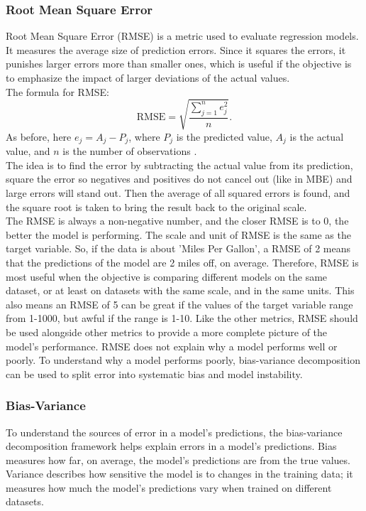 \newpage

\subsubsection{Root Mean Square Error}   

Root Mean Square Error (RMSE) is a metric used to evaluate regression models. It measures the average size of prediction errors. Since it squares the errors, it punishes larger errors more than smaller ones, which is useful if the objective is to emphasize the impact of larger deviations of the actual values.
\\
The formula for RMSE:
\begin{equation}
	\text{RMSE}=\sqrt{\frac{ \sum_{j=1}^{n} e_j^2 }{n}}.
\end{equation}
As before, here $e_{j}=A_{j}-P_{j}$, where $P_{j}$ is the predicted value, $A_{j}$ is the actual value, and $n$ is the number of observations \cite{metrics}.
\\ The idea is to find the error by subtracting the actual value from its prediction, square the error so negatives and positives do not cancel out (like in MBE) and large errors will stand out. Then the average of all squared errors is found, and the square root is taken to bring the result back to the original scale. 
\\

\noindent The RMSE is always a non-negative number, and the closer RMSE is to 0, the better the model is performing. The scale and unit of RMSE is the same as the target variable. So, if the data is about 'Miles Per Gallon', a RMSE of 2 means that the predictions of the model are 2 miles off, on average. Therefore, RMSE is most useful when the objective is comparing different models on the same dataset, or at least on datasets with the same scale, and in the same units. This also means an RMSE of 5 can be great if the values of the target variable range from 1-1000, but awful if the range is 1-10. Like the other metrics, RMSE should be used alongside other metrics to provide a more complete picture of the model’s performance. RMSE does not explain why a model performs well or poorly. To understand why a model performs poorly, bias-variance decomposition can be used to split error into systematic bias and model instability.
\newpage

\subsubsection{Bias-Variance}
To understand the sources of error in a model’s predictions, the bias-variance decomposition framework helps explain errors in a model’s predictions. Bias measures how far, on average, the model's predictions are from the true values. Variance describes how sensitive the model is to changes in the training data; it measures how much the model’s predictions vary when trained on different datasets. 

